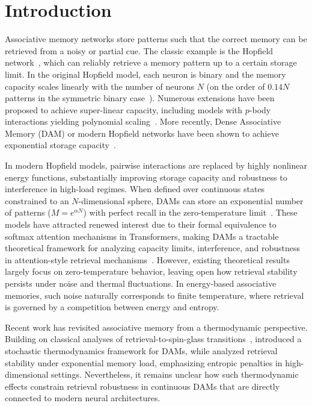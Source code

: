 \documentclass{article}
\theoremstyle{plain}
\theoremstyle{definition}
\theoremstyle{remark}
\begin{document}
\section{Introduction}

Associative memory networks store patterns such that the correct memory can be retrieved from a noisy or partial cue. The classic example is the Hopfield network~\citep{Hopfield1982}, which can reliably retrieve a memory pattern up to a certain storage limit. In the original Hopfield model, each neuron is binary and the memory capacity scales linearly with the number of neurons $N$ (on the order of $0.14N$ patterns in the symmetric binary case~\citep{amit1985storing}). Numerous extensions have been proposed to achieve super-linear capacity, including models with $p$-body interactions yielding polynomial scaling~\citep{gardner1988space,krotov2016dense}. More recently, Dense Associative Memory (DAM) or modern Hopfield networks have been shown to achieve exponential storage capacity~\citep{demircigil2017model,ramsauer2021hopfield}.

In modern Hopfield models, pairwise interactions are replaced by highly nonlinear energy functions, substantially improving storage capacity and robustness to interference in high-load regimes. When defined over continuous states constrained to an $N$-dimensional sphere, DAMs can store an exponential number of patterns ($M = e^{\alpha N}$) with perfect recall in the zero-temperature limit~\citep{demircigil2017model,ramsauer2021hopfield,lucibello2024exponential}. These models have attracted renewed interest due to their formal equivalence to softmax attention mechanisms in Transformers, making DAMs a tractable theoretical framework for analyzing capacity limits, interference, and robustness in attention-style retrieval mechanisms~\citep{ramsauer2021hopfield}. However, existing theoretical results largely focus on zero-temperature behavior, leaving open how retrieval stability persists under noise and thermal fluctuations. In energy-based associative memories, such noise naturally corresponds to finite temperature, where retrieval is governed by a competition between energy and entropy.

Recent work has revisited associative memory from a thermodynamic perspective. Building on classical analyses of retrieval-to-spin-glass transitions~\citep{amit1987statistical}, \citet{rooke2026stochastic} introduced a stochastic thermodynamics framework for DAMs, while \citet{lucibello2024exponential} analyzed retrieval stability under exponential memory load, emphasizing entropic penalties in high-dimensional settings. Nevertheless, it remains unclear how such thermodynamic effects constrain retrieval robustness in continuous DAMs that are directly connected to modern neural architectures.
\end{document}
